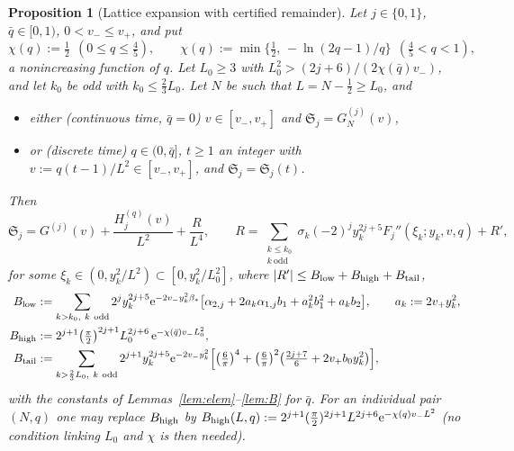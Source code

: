 \documentclass[11pt,a4paper]{article}
\newtheorem{proposition}[theorem]{Proposition}
\theoremstyle{definition}
\theoremstyle{remark}
\newcommand{\ee}{\mathrm{e}}
\begin{document}
\begin{proposition}[Lattice expansion with certified remainder]\label{prop:lattice}
Let $j\in\{0,1\}$, $\bar q\in[0,1)$, $0<v_-\le v_+$, and put
\begin{equation}\label{eq:chi}
  \chi(q):=\tfrac12\ \ (0\le q\le\tfrac45),\qquad \chi(q):=\min\bigl\{\tfrac12,\,-\ln(2q-1)/q\bigr\}\ \ (\tfrac45<q<1),
\end{equation}
a nonincreasing function of $q$. Let $L_0\ge3$ with $L_0^2>(2j+6)/(2\chi(\bar q)v_-)$, and let $k_0$ be odd
with $k_0\le\frac23L_0$. Let $N$ be such that $L=N-\frac12\ge L_0$, and
\begin{itemize}
\item either (continuous time, $\bar q=0$) $v\in[v_-,v_+]$ and $\mathfrak S_j=G_N^{(j)}(v)$,
\item or (discrete time) $q\in(0,\bar q]$, $t\ge1$ an integer with $v:=q(t-1)/L^2\in[v_-,v_+]$, and
$\mathfrak S_j=\mathfrak S_j(t)$.
\end{itemize}
Then
\begin{equation}\label{eq:expansion}
  \mathfrak S_j=G^{(j)}(v)+\frac{H_j^{(q)}(v)}{L^2}+\frac{R}{L^4},\qquad
  R=\sum_{\substack{k\le k_0\\ k\ \mathrm{odd}}}\sigma_k(-2)^jy_k^{2j+5}F_j''(\xi_k;y_k,v,q)+R',
\end{equation}
for some $\xi_k\in(0,y_k^2/L^2)\subset[0,y_k^2/L_0^2]$, where $|R'|\le B_{\rm low}+B_{\rm high}+B_{\rm tail}$,
\begin{align*}
 B_{\rm low}&:=\sum_{k>k_0,\ k\ \rm odd}2^jy_k^{2j+5}\ee^{-2v_-y_k^2\beta_*}
     \bigl[\alpha_{2,j}+2a_k\alpha_{1,j}b_1+a_k^2b_1^2+a_kb_2\bigr],\qquad a_k:=2v_+y_k^2,\\
 B_{\rm high}&:=2^{j+1}\bigl(\tfrac\pi2\bigr)^{2j+1}L_0^{2j+6}\,\ee^{-\chi(\bar q)v_-L_0^2},\\
 B_{\rm tail}&:=\sum_{k>\frac23L_0,\ k\ \rm odd}2^{j+1}y_k^{2j+5}\ee^{-2v_-y_k^2}
     \Bigl[\bigl(\tfrac6\pi\bigr)^4+\bigl(\tfrac6\pi\bigr)^2\bigl(\tfrac{2j+7}6+2v_+b_0y_k^2\bigr)\Bigr],
\end{align*}
with the constants of Lemmas~\ref{lem:elem}--\ref{lem:B} for $\bar q$. For an individual pair $(N,q)$ one may
replace $B_{\rm high}$ by $B_{\rm high}(L,q):=2^{j+1}(\frac\pi2)^{2j+1}L^{2j+6}\ee^{-\chi(q)v_-L^2}$ (no condition linking
$L_0$ and $\chi$ is then needed).
\end{proposition}
\end{document}
